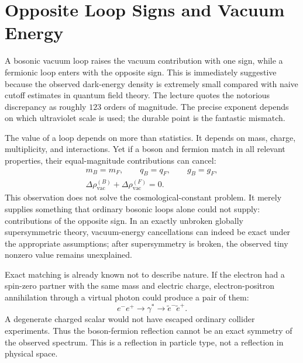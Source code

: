 \section{Opposite Loop Signs and Vacuum Energy}

A bosonic vacuum loop raises the vacuum contribution with one sign, while a fermionic loop enters with the opposite sign. This is immediately suggestive because the observed dark-energy density is extremely small compared with naive cutoff estimates in quantum field theory. The lecture quotes the notorious discrepancy as roughly \(123\) orders of magnitude. The precise exponent depends on which ultraviolet scale is used; the durable point is the fantastic mismatch.

The value of a loop depends on more than statistics. It depends on mass, charge, multiplicity, and interactions. Yet if a boson and fermion match in all relevant properties, their equal-magnitude contributions can cancel:
\begin{equation}
\begin{gathered}
m_B=m_F,\qquad q_B=q_F,\qquad g_B=g_F,\\
\Delta\rho_{\mathrm{vac}}^{(B)}
+\Delta\rho_{\mathrm{vac}}^{(F)}=0.
\end{gathered}
\end{equation}
This observation does not solve the cosmological-constant problem. It merely supplies something that ordinary bosonic loops alone could not supply: contributions of the opposite sign. In an exactly unbroken globally supersymmetric theory, vacuum-energy cancellations can indeed be exact under the appropriate assumptions; after supersymmetry is broken, the observed tiny nonzero value remains unexplained.

Exact matching is already known not to describe nature. If the electron had a spin-zero partner with the same mass and electric charge, electron-positron annihilation through a virtual photon could produce a pair of them:
\begin{equation}
e^-e^+\longrightarrow\gamma^*
\longrightarrow\widetilde e^-\widetilde e^+.
\end{equation}
A degenerate charged scalar would not have escaped ordinary collider experiments. Thus the boson-fermion reflection cannot be an exact symmetry of the observed spectrum. This is a reflection in particle type, not a reflection in physical space.

